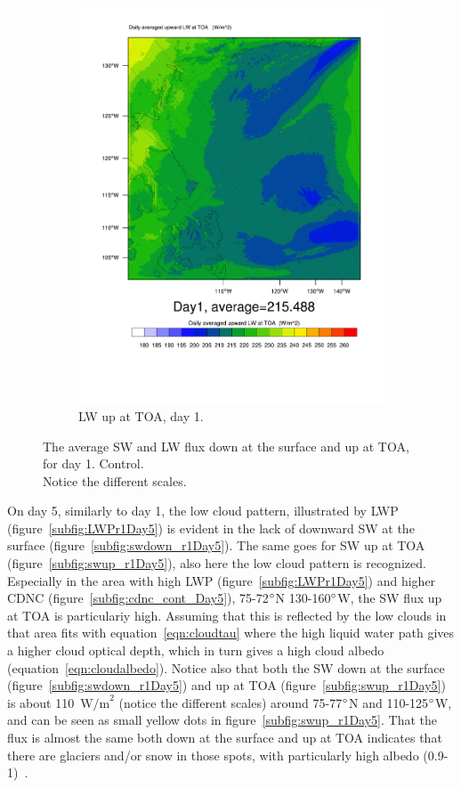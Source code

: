 \begin{figure}
\begin{subfigure}{0.48\textwidth}
		\includegraphics[width=\textwidth]{results/control/LWUPT_Day1.pdf}
		\caption{LW up at TOA, day 1.}
		\label{subfig:lwup_r1Day1}
	\end{subfigure}
	\caption{The average SW and LW flux down at the surface and up at TOA, for day 1. Control. \\Notice the different scales.}
	\label{fig:radiation_r1Day1}
\end{figure}

On day 5, similarly to day 1, the low cloud pattern, illustrated by LWP (figure~\ref{subfig:LWPr1Day5}) is evident in the lack of downward SW at the surface (figure~\ref{subfig:swdown_r1Day5}). The same goes for SW up at TOA (figure~\ref{subfig:swup_r1Day5}), also here the low cloud pattern is recognized. Especially in the area with high LWP (figure~\ref{subfig:LWPr1Day5}) and higher CDNC (figure~\ref{subfig:cdnc_cont_Day5}), 75-72$\degree$N 130-160$\degree$W, the SW flux up at TOA is particulariy high. Assuming that this is reflected by the low clouds in that area fits with equation~\ref{eqn:cloudtau} where the high liquid water path gives a higher cloud optical depth, which in turn gives a high cloud albedo (equation~\ref{eqn:cloudalbedo}). Notice also that both the SW down at the surface (figure~\ref{subfig:swdown_r1Day5}) and up at TOA (figure~\ref{subfig:swup_r1Day5}) is about 110~$\text{W/m}^2$ (notice the different scales) around 75-77$\degree$N and 110-125$\degree$W, and can be seen as small yellow dots in figure~\ref{subfig:swup_r1Day5}. That the flux is almost the same both down at the surface and up at TOA indicates that there are glaciers and/or snow in those spots, with particularly high albedo (0.9-1)~\citep{NSIDC}.

